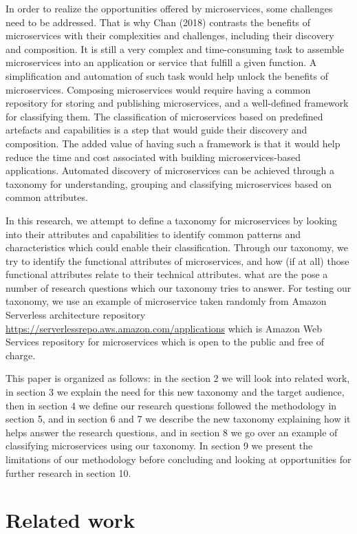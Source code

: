 \documentclass{article}
\begin{document}
In order to realize the opportunities offered by microservices, some challenges need to be addressed. That is why Chan (2018) contrasts the benefits of microservices with their complexities and challenges, including their discovery and composition. It is still a very complex and time-consuming task to assemble microservices into an application or service that fulfill a given function. A simplification and automation of such task would help unlock the benefits of microservices. Composing microservices would require having a common repository for storing and publishing microservices, and a well-defined framework for classifying them. The classification of microservices based on predefined artefacts and capabilities is a step that would guide their discovery and composition. The added value of having such a framework is that it would help reduce the time and cost associated with building microservices-based applications. Automated discovery of microservices can be achieved through a taxonomy for understanding, grouping and classifying microservices based on common attributes. 

In this research, we attempt to define a taxonomy for microservices by looking into their attributes and capabilities to identify common patterns and characteristics which could enable their classification. Through our taxonomy, we try to identify the functional attributes of microservices, and how (if at all) those functional attributes relate to their technical attributes. what are the pose a number of research questions which our taxonomy tries to answer. For testing our taxonomy, we use an example of microservice taken randomly from Amazon Serverless architecture repository \url{https://serverlessrepo.aws.amazon.com/applications} which is Amazon Web Services repository for microservices which is open to the public and free of charge. 

This paper is organized as follows: in the section 2 we will look into related work, in section 3 we explain the need for this new taxonomy and the target audience, then in section 4 we define our research questions followed the methodology in section 5, and in section 6 and 7 we describe the new taxonomy explaining how it helps answer the research questions, and in section 8 we go over an example of classifying microservices using our taxonomy. In section 9 we present the limitations of our methodology before concluding and looking at opportunities for further research in section 10.



\section{Related work}
\end{document}

